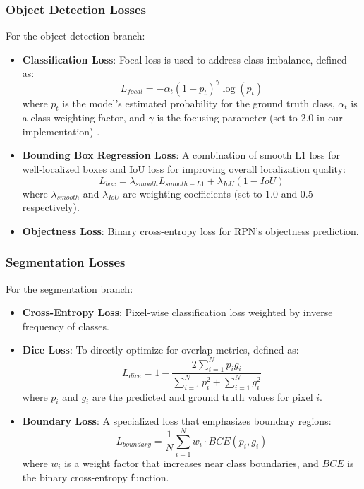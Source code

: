 \subsubsection{Object Detection Losses}
For the object detection branch:

\begin{itemize}
    \item \textbf{Classification Loss}: Focal loss is used to address class imbalance, defined as:
    \begin{equation}
        L_{focal} = -\alpha_t (1 - p_t)^\gamma \log(p_t)
    \end{equation}
    where $p_t$ is the model's estimated probability for the ground truth class, $\alpha_t$ is a class-weighting factor, and $\gamma$ is the focusing parameter (set to 2.0 in our implementation) \cite{lin2017focal}.
    
    \item \textbf{Bounding Box Regression Loss}: A combination of smooth L1 loss for well-localized boxes and IoU loss for improving overall localization quality:
    \begin{equation}
        L_{box} = \lambda_{smooth} L_{smooth-L1} + \lambda_{IoU} (1 - IoU)
    \end{equation}
    where $\lambda_{smooth}$ and $\lambda_{IoU}$ are weighting coefficients (set to 1.0 and 0.5 respectively).
    
    \item \textbf{Objectness Loss}: Binary cross-entropy loss for RPN's objectness prediction.
\end{itemize}

\subsubsection{Segmentation Losses}
For the segmentation branch:

\begin{itemize}
    \item \textbf{Cross-Entropy Loss}: Pixel-wise classification loss weighted by inverse frequency of classes.
    
    \item \textbf{Dice Loss}: To directly optimize for overlap metrics, defined as:
    \begin{equation}
        L_{dice} = 1 - \frac{2 \sum_{i=1}^{N} p_i g_i}{\sum_{i=1}^{N} p_i^2 + \sum_{i=1}^{N} g_i^2}
    \end{equation}
    where $p_i$ and $g_i$ are the predicted and ground truth values for pixel $i$.
    
    \item \textbf{Boundary Loss}: A specialized loss that emphasizes boundary regions:
    \begin{equation}
        L_{boundary} = \frac{1}{N} \sum_{i=1}^{N} w_i \cdot BCE(p_i, g_i)
    \end{equation}
    where $w_i$ is a weight factor that increases near class boundaries, and $BCE$ is the binary cross-entropy function.
\end{itemize}

